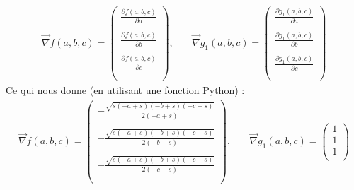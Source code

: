 \documentclass[12pt]{report}
\begin{document}
\begin{align*}
\overrightarrow{\nabla}f(a,b,c) = 
\left(\begin{matrix}
\frac{\partial f(a,b,c)}{\partial a} \\ \\
\frac{\partial f(a,b,c)}{\partial b} \\ \\
\frac{\partial f(a,b,c)}{\partial c} \\ \\
\end{matrix}\right),\quad          &  \overrightarrow{\nabla}g_{1}(a,b,c) = 
\left(\begin{matrix}
\frac{\partial g_{1}(a,b,c)}{\partial a} \\ \\
\frac{\partial g_{1}(a,b,c)}{\partial b} \\ \\
\frac{\partial g_{1}(a,b,c)}{\partial c} \\ \\
\end{matrix}\right)      
\end{align*}
\indent Ce qui nous donne (en utilisant une fonction Python) :
\begin{align*}
\overrightarrow{\nabla}f(a,b,c) = 
\left(\begin{matrix}
- \frac{\sqrt{s \left(- a + s\right) \left(- b + s\right) \left(- c + s\right)}}{2 \left(- a + s\right)}\\ \\
- \frac{\sqrt{s \left(- a + s\right) \left(- b + s\right) \left(- c + s\right)}}{2 \left(- b + s\right)}\\ \\
- \frac{\sqrt{s \left(- a + s\right) \left(- b + s\right) \left(- c + s\right)}}{2 \left(- c + s\right)} \\ \\
\end{matrix}\right),\quad          &  \overrightarrow{\nabla}g_{1}(a,b,c) = 
\left(\begin{matrix}
1 \\ 
1 \\ 
1 \\ 
\end{matrix}\right)      
\end{align*}
\end{document}
